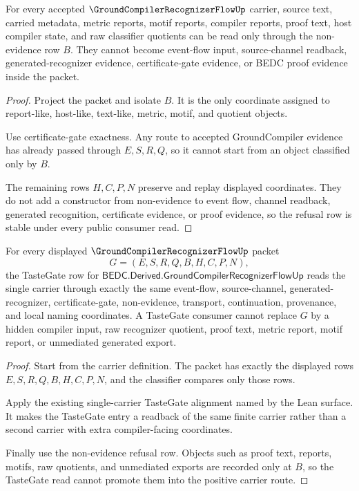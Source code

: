 \begin{theorem}
\label{thm:groundcompiler-recognizer-flow-non-evidence-refusal}
For every accepted $\GroundCompilerRecognizerFlowUp$ carrier, source text, carried metadata, metric reports, motif reports, compiler reports, proof text, host compiler state, and raw classifier quotients can be read only through the non-evidence row $B$. They cannot become event-flow input, source-channel readback, generated-recognizer evidence, certificate-gate evidence, or BEDC proof evidence inside the packet.
\end{theorem}
\begin{proof}
Project the packet and isolate $B$. It is the only coordinate assigned to report-like, host-like, text-like, metric, motif, and quotient objects.

Use certificate-gate exactness. Any route to accepted GroundCompiler evidence has already passed through $E,S,R,Q$, so it cannot start from an object classified only by $B$.

The remaining rows $H,C,P,N$ preserve and replay displayed coordinates. They do not add a constructor from non-evidence to event flow, channel readback, generated recognition, certificate evidence, or proof evidence, so the refusal row is stable under every public consumer read.
\end{proof}

\begin{theorem}
\label{thm:groundcompiler-recognizer-flow-tastegate-carrier-readback}
For every displayed $\GroundCompilerRecognizerFlowUp$ packet
$$
G=(E,S,R,Q,B,H,C,P,N),
$$
the TasteGate row for $\mathsf{BEDC.Derived.GroundCompilerRecognizerFlowUp}$ reads the single carrier through exactly the same event-flow, source-channel, generated-recognizer, certificate-gate, non-evidence, transport, continuation, provenance, and local naming coordinates. A TasteGate consumer cannot replace $G$ by a hidden compiler input, raw recognizer quotient, proof text, metric report, motif report, or unmediated generated export.
\end{theorem}
\begin{proof}
Start from the carrier definition. The packet has exactly the displayed rows $E,S,R,Q,B,H,C,P,N$, and the classifier compares only those rows.

Apply the existing single-carrier TasteGate alignment named by the Lean surface. It makes the TasteGate entry a readback of the same finite carrier rather than a second carrier with extra compiler-facing coordinates.

Finally use the non-evidence refusal row. Objects such as proof text, reports, motifs, raw quotients, and unmediated exports are recorded only at $B$, so the TasteGate read cannot promote them into the positive carrier route.
\end{proof}

